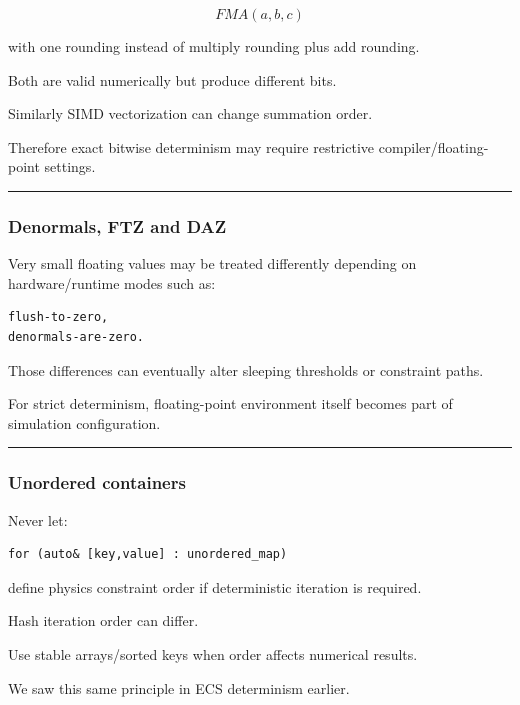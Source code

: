 \[
FMA(a,b,c)
\]

with one rounding instead of multiply rounding plus add rounding.

Both are valid numerically but produce different bits.

Similarly SIMD vectorization can change summation order.

Therefore exact bitwise determinism may require restrictive compiler/floating-point settings.

\begin{center}\rule{0.5\linewidth}{0.5pt}\end{center}

\subsubsection{Denormals, FTZ and DAZ}\label{denormals-ftz-and-daz}

Very small floating values may be treated differently depending on hardware/runtime modes such as:

\begin{verbatim}
flush-to-zero,
denormals-are-zero.
\end{verbatim}

Those differences can eventually alter sleeping thresholds or constraint paths.

For strict determinism, floating-point environment itself becomes part of simulation configuration.

\begin{center}\rule{0.5\linewidth}{0.5pt}\end{center}

\subsubsection{Unordered containers}\label{unordered-containers}

Never let:

\begin{verbatim}
for (auto& [key,value] : unordered_map)
\end{verbatim}

define physics constraint order if deterministic iteration is required.

Hash iteration order can differ.

Use stable arrays/sorted keys when order affects numerical results.

We saw this same principle in ECS determinism earlier.


